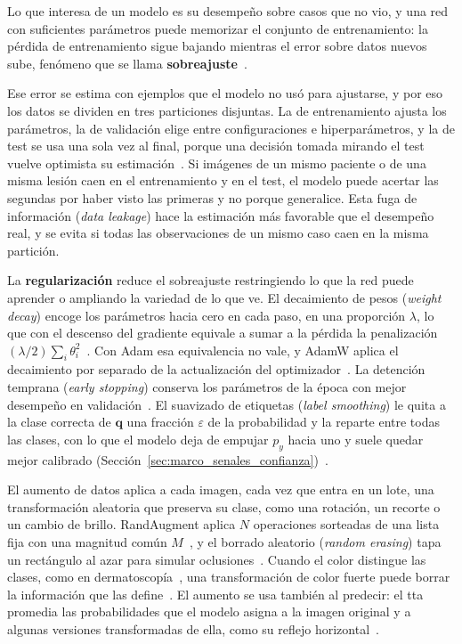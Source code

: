 Lo que interesa de un modelo es su desempeño sobre casos que no vio, y una red con suficientes parámetros puede
memorizar el conjunto de entrenamiento: la pérdida de entrenamiento sigue bajando mientras el error sobre datos
nuevos sube, fenómeno que se llama \textbf{sobreajuste}~\cite{goodfellow2016deep}.

Ese error se estima con ejemplos que el modelo no usó para ajustarse, y por eso los datos se dividen en tres
particiones disjuntas. La de entrenamiento ajusta los parámetros, la de validación elige entre configuraciones
e hiperparámetros, y la de test se usa una sola vez al final, porque una decisión tomada mirando el test vuelve
optimista su estimación~\cite{goodfellow2016deep}. Si imágenes de un mismo paciente o de una misma lesión caen
en el entrenamiento y en el test, el modelo puede acertar las segundas por haber visto las primeras y no porque
generalice. Esta fuga de información (\emph{data leakage}) hace la estimación más favorable que el desempeño
real, y se evita si todas las observaciones de un mismo caso caen en la misma partición.

La \textbf{regularización} reduce el sobreajuste restringiendo lo que la red puede aprender o ampliando la
variedad de lo que ve. El decaimiento de pesos (\emph{weight decay}) encoge los parámetros hacia cero en cada
paso, en una proporción $\lambda$, lo que con el descenso del gradiente equivale a sumar a la pérdida la
penalización $(\lambda/2)\sum_i \theta_i^2$~\cite{goodfellow2016deep}. Con Adam esa equivalencia no vale, y
AdamW aplica el decaimiento por separado de la actualización del optimizador~\cite{loshchilov2019decoupled}. La
detención temprana (\emph{early stopping}) conserva los parámetros de la época con mejor desempeño en
validación~\cite{goodfellow2016deep}. El suavizado de etiquetas (\emph{label smoothing}) le quita a la clase
correcta de $\mathbf{q}$ una fracción $\varepsilon$ de la probabilidad y la reparte entre todas las clases,
con lo que el modelo deja de empujar $p_y$ hacia uno y suele quedar mejor calibrado
(Sección~\ref{sec:marco_senales_confianza})~\cite{szegedy2016rethinking,muller2019does}.

El aumento de datos aplica a cada imagen, cada vez que entra en un lote, una transformación aleatoria que
preserva su clase, como una rotación, un recorte o un cambio de brillo. RandAugment aplica $N$ operaciones
sorteadas de una lista fija con una magnitud común $M$~\cite{cubuk2020randaugment}, y el borrado aleatorio
(\emph{random erasing}) tapa un rectángulo al azar para simular oclusiones~\cite{zhong2020random}. Cuando el color distingue las clases, como
en dermatoscopía~\cite{kittler2016standardization}, una transformación de color fuerte puede borrar la
información que las define~\cite{shorten2019survey}. El aumento se usa también al predecir: el \gls{tta}
promedia las probabilidades que el modelo asigna a la imagen original y a algunas versiones transformadas de
ella, como su reflejo horizontal~\cite{krizhevsky2012imagenet}.

